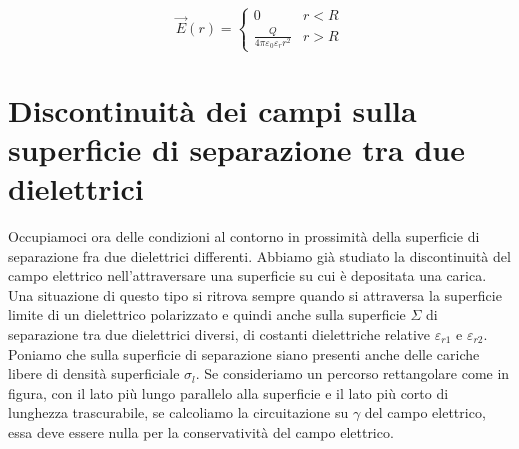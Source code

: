 \[
	\vec{E} (r) = \left\{ \begin{array}{ll}
	 	0 & r<R \\
		\frac{Q}{4\pi \varepsilon_0 \varepsilon_r r^2} & r>R
	\end{array} \right.
\]

\section{Discontinuità dei campi sulla superficie di separazione tra due dielettrici}

Occupiamoci ora delle condizioni al contorno in prossimità della superficie di separazione fra due dielettrici differenti. Abbiamo già studiato la discontinuità del campo elettrico nell'attraversare una superficie su cui è depositata una carica. Una situazione di questo tipo si ritrova sempre quando si attraversa la superficie limite di un dielettrico polarizzato e quindi anche sulla superficie $\Sigma$ di separazione tra due dielettrici diversi, di costanti dielettriche relative $\varepsilon_{r1}$ e $\varepsilon_{r2}$. Poniamo che sulla superficie di separazione siano presenti anche delle cariche libere di densità superficiale $ \sigma_l  $. Se consideriamo un percorso rettangolare come in figura, con il lato più lungo parallelo alla superficie e il lato più corto di lunghezza trascurabile, se calcoliamo la circuitazione su $\gamma$ del campo elettrico, essa deve essere nulla per la conservatività del campo elettrico.

